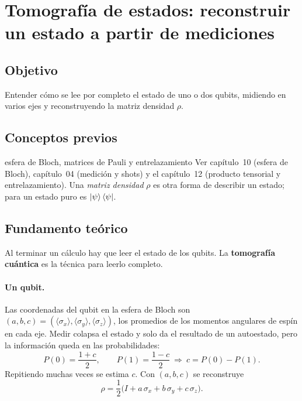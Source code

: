 \def\tituloconcepto{Tomografía de estados}


\section{Tomografía de estados: reconstruir un estado a partir de mediciones}

\subsection{Objetivo}
Entender cómo se lee por completo el estado de uno o dos qubits, midiendo en
varios ejes y reconstruyendo la matriz densidad $\rho$.

\subsection{Conceptos previos}
\begin{concepto}{esfera de Bloch, matrices de Pauli y entrelazamiento}
Ver capítulo~10 (esfera de Bloch), capítulo~04 (medición y shots) y el
capítulo~12 (producto tensorial y entrelazamiento). Una \emph{matriz densidad}
$\rho$ es otra forma de describir un estado; para un estado puro es
$\left|\psi\right\rangle\left\langle\psi\right|$.
\end{concepto}

\subsection{Fundamento teórico}
Al terminar un cálculo hay que leer el estado de los qubits. La \textbf{tomografía
cuántica} es la técnica para leerlo completo.

\paragraph{Un qubit.} Las coordenadas del qubit en la esfera de Bloch son
$(a,b,c)=(\langle\sigma_x\rangle,\langle\sigma_y\rangle,\langle\sigma_z\rangle)$,
los promedios de los momentos angulares de espín en cada eje. Medir colapsa el
estado y solo da el resultado de un autoestado, pero la información queda en las
probabilidades:
\begin{equation}
  P(0)=\frac{1+c}{2},\qquad P(1)=\frac{1-c}{2}\ \Longrightarrow\ c=P(0)-P(1).
\end{equation}
Repitiendo muchas veces se estima $c$. Con $(a,b,c)$ se reconstruye
\begin{equation}
  \rho=\frac12\big(I+a\,\sigma_x+b\,\sigma_y+c\,\sigma_z\big).
\end{equation}

